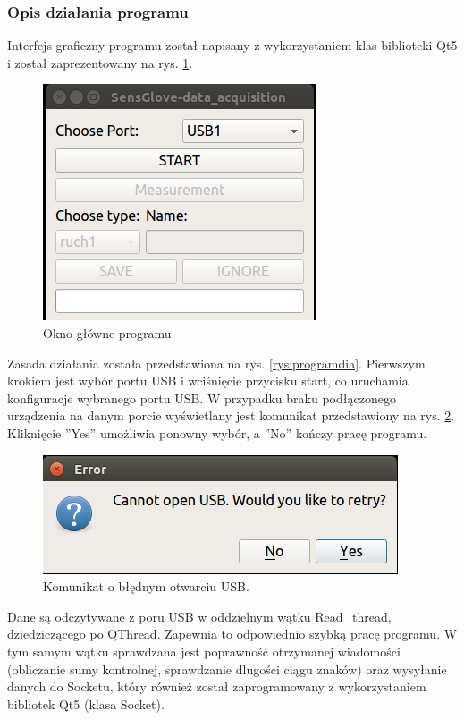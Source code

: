 \documentclass{article}
\begin{document}
\subsubsection{Opis działania programu}

Interfejs graficzny programu został napisany z wykorzystaniem klas biblioteki Qt5 i został zaprezentowany na rys. \ref{rys:okno}. 
\begin{figure}[H]
    \centering
    \includegraphics[scale=0.6]{okno.png}
    \caption{Okno główne programu}
    \label{rys:okno}
\end{figure}

Zasada działania została przedstawiona na rys. \ref{rys:programdia}. 
Pierwszym krokiem jest wybór portu USB i wciśnięcie przycisku start, co uruchamia konfiguracje wybranego portu USB. W przypadku braku podłączonego urządzenia na danym porcie wyświetlany jest komunikat przedstawiony na rys. \ref{rys:oknousb}. Kliknięcie ''Yes'' umożliwia ponowny wybór, a ''No'' kończy pracę programu.\\
\begin{figure}[H]
    \begin{center}
    \includegraphics[scale=0.6]{oknousb.png}
    \caption{Komunikat o błędnym otwarciu USB.}
    \label{rys:oknousb}
    \end{center}
\end{figure}
Dane są odczytywane z poru USB w oddzielnym wątku Read\_thread, dziedziczącego po QThread. Zapewnia to odpowiednio szybką pracę programu. W tym samym wątku sprawdzana jest poprawność otrzymanej wiadomości (obliczanie sumy kontrolnej, sprawdzanie dlugości ciągu znaków) oraz wysyłanie danych do Socketu, który również został zaprogramowany z wykorzystaniem bibliotek Qt5 (klasa Socket).
\end{document}
